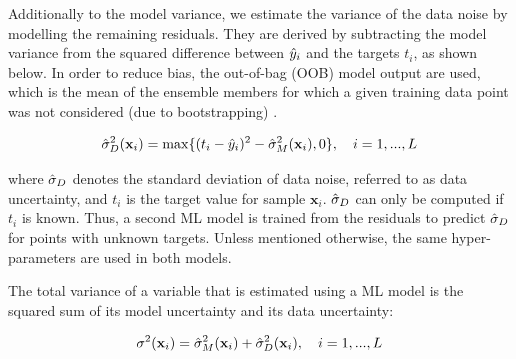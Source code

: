 Additionally to the model variance, we estimate the variance of the data noise by modelling the remaining residuals. They are derived by subtracting the model variance from the squared difference between $\Hat{y}_i$ and the targets $t_i$, as shown below.
In order to reduce bias, the out-of-bag (OOB) model output are used, which is the mean of the ensemble members for which a given training data point was not considered (due to bootstrapping) \cite{heskes_practical_1997}. 

\begin{equation}
\label{eq:data_unc}
  \Hat{\sigma}_D^2 (\mathbf{x}_i) = \max \{ (t_i - \Hat{y}_i)^2 - \Hat{\sigma}_M^2 (\mathbf{x}_i) , 0 \}, \quad i=1,...,L
\end{equation}
 
 where $\Hat{\sigma}_D$ denotes the standard deviation of data noise, referred to as data uncertainty, and $t_i$ is the target value for sample $\mathbf{x}_i$. 
$\Hat{\sigma}_D$ can only be computed if $t_i$ is known. Thus, a second ML model is trained from the residuals to predict $\Hat{\sigma}_D$ for points with unknown targets. Unless mentioned otherwise, the same hyper-parameters are used in both models.

The total variance of a variable that is estimated using a ML model is the squared sum of its model uncertainty and its data uncertainty: 

\begin{equation}
\label{eq:total_unc}
\sigma^2 (\mathbf{x}_i) = \Hat{\sigma}_M^2 (\mathbf{x}_i) + \Hat{\sigma}_D^2 (\mathbf{x}_i), \quad i=1,...,L
\end{equation}


